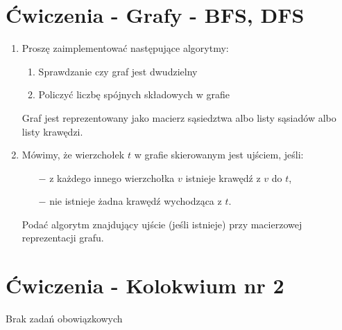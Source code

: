 \documentclass[11pt]{article}
\begin{document}
\section{Ćwiczenia - Grafy - BFS, DFS}
\begin{enumerate}
		
	\item Proszę zaimplementować następujące algorytmy:
	\begin{enumerate}
		\item Sprawdzanie czy graf jest dwudzielny
		\item Policzyć liczbę spójnych składowych w grafie
	\end{enumerate}
	Graf jest reprezentowany jako macierz sąsiedztwa albo listy sąsiadów albo listy krawędzi.
	
	\item Mówimy, że wierzchołek $t$ w grafie skierowanym jest ujściem, jeśli:	
	\begin{itemize}
		\item[$-$] z każdego innego wierzchołka $v$ istnieje krawędź z $v$ do $t$,
		\item[$-$] nie istnieje żadna krawędź wychodząca z $t$.
	\end{itemize}
	Podać algorytm znajdujący ujście (jeśli istnieje) przy macierzowej reprezentacji grafu.
	\end{enumerate}
\section{Ćwiczenia - Kolokwium nr 2}
	Brak zadań obowiązkowych
	
\end{document}
